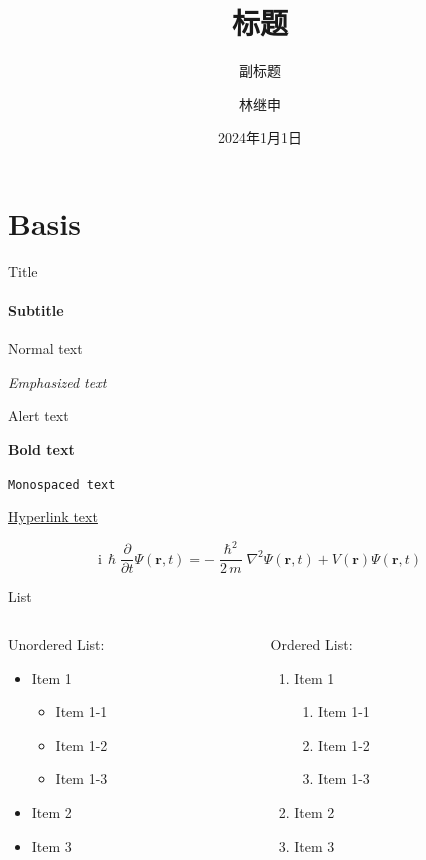 \documentclass{beamer}
\title{标题}
\subtitle{副标题}
\author{林继申}
\date{2024年1月1日}
\newcommand{\hrefcol}[2]{\textcolor{cyan}{\href{#1}{#2}}}
\begin{document}
\maketitle


\section{Basis}


\begin{frame}[fragile]{Title}
\framesubtitle{Subtitle}
Normal text

\emph{Emphasized text}

\alert{Alert text}

\textbf{Bold text}

\texttt{Monospaced text}

\hrefcol{https://github.com/MinmusLin/Tongji_University_Beamer_Template}{Hyperlink text}

\begin{equation*}
\mathrm{i}\,\hslash\frac{\partial}{\partial t} \Psi(\mathbf{r},t) = -\frac{\hslash^2}{2\,m}\nabla^2\Psi(\mathbf{r},t) + V(\mathbf{r})\Psi(\mathbf{r},t)
\end{equation*}
\end{frame}


\begin{frame}[fragile]{List}
\begin{columns}
\begin{column}{0.45\textwidth}
Unordered List:
\begin{itemize}
\item Item 1
\begin{itemize}
\item Item 1-1
\item Item 1-2
\item Item 1-3
\end{itemize}
\item Item 2
\item Item 3
\end{itemize}
\end{column}
\begin{column}{0.45\textwidth}
Ordered List:
\begin{enumerate}
\item Item 1
\begin{enumerate}
\item Item 1-1
\item Item 1-2
\item Item 1-3
\end{enumerate}
\item Item 2
\item Item 3
\end{enumerate}
\end{column}
\end{columns}
\end{frame}
\end{document}
